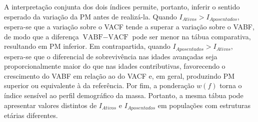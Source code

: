 A interpretação conjunta dos dois índices permite, portanto, inferir o sentido esperado da variação da PM antes de realizá-la. Quando $I_{Ativos} > I_{Aposentados}$, espera-se que a variação sobre o VACF tende a superar a variação sobre o VABF, de modo que a diferença $\text{VABF} - \text{VACF}$ pode ser menor na tábua comparativa, resultando em PM inferior. Em contrapartida, quando $I_{Aposentados} > I_{Ativos}$, espera-se que o diferencial de sobrevivência nas idades avançadas seja proporcionalmente maior do que nas idades contributivas, favorecendo o crescimento do VABF em relação ao do VACF e, em geral, produzindo PM superior ou equivalente à da referência. Por fim, a ponderação $w(f)$ torna o índice sensível ao perfil demográfico da massa. Portanto, a mesma tábua pode apresentar valores distintos de $I_{Ativos}$ e $I_{Aposentados}$ em populações com estruturas etárias diferentes.